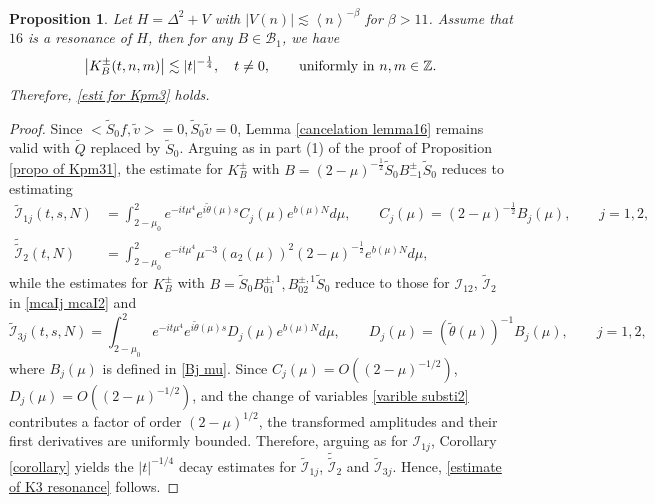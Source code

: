 \documentclass[reqno, 11pt]{amsart}
\newtheorem{proposition}[definition]{Proposition}
\newcommand\Z{\mathbb{Z}}
\newcommand\mcaI{\mathcal{I}}
\newcommand\mcaB{\mathcal{B}}
\numberwithin{equation}{section}
\begin{document}
\begin{proposition}\label{propo of resonance 2}
Let $H=\Delta^2+V$ with $|V(n)|\lesssim \left<n\right>^{-\beta}$ for $\beta>11$. Assume that $16$ is a resonance of $H$, then for any $B\in\mcaB_{1}$, we have
\begin{equation}\label{estimate of K3 resonance}
\left|K^{\pm}_{B}(t,n,m)\right|\lesssim |t|^{-\frac{1}{4}},\quad t\neq0,\qquad {\rm uniformly\ in}\ n,m\in\Z.
\end{equation}
Therefore, \eqref{esti for Kpm3} holds.
\end{proposition}
\begin{proof}
Since $\big<\widetilde{S}_0f,\tilde{v}\big>=0,\widetilde{S}_0\tilde{v}=0$, Lemma \ref{cancelation lemma16} remains valid with $\widetilde Q$ replaced by $\widetilde S_0$. Arguing as in part {\rm(1)} of the proof of Proposition \ref{propo of Kpm31}, the estimate for $K^{\pm}_B$ with $B=(2-\mu)^{-\frac{1}{2}}\widetilde{S}_0B^{\pm}_{-1}\widetilde{S}_0$ reduces to estimating 
\begin{align*}
\widetilde{\mcaI}_{1j}(t,s,N)&=\int_{2-\mu_0}^{2}e^{-it\mu^4}e^{i\widetilde{\theta}(\mu)s}C_j(\mu)e^{b(\mu)N}d\mu,\qquad C_j(\mu)=(2-\mu)^{-\frac12}B_{j}(\mu),\qquad j=1,2,\\
\widetilde{\widetilde{\mcaI}}_{2}(t,N)&=\int_{2-\mu_0}^{2}e^{-it\mu^4}\mu^{-3}(a_2(\mu))^2(2-\mu)^{-\frac{1}{2}}e^{b(\mu)N}d\mu,
\end{align*}
while the estimates for $K^{\pm}_B$ with $B=\widetilde{S}_0B^{\pm,1}_{01},B^{\pm,1}_{02}\widetilde{S}_0$ reduce to those for $\mcaI_{12}$, $\widetilde{\mcaI}_2$ in \eqref{mcaIj mcaI2} and  
\begin{equation*}
    \widetilde{\mcaI}_{3j}(t,s,N)=\int_{2-\mu_0}^{2}e^{-it\mu^4}e^{i\widetilde{\theta}(\mu)s}D_j(\mu)e^{b(\mu)N}d\mu,\qquad D_j(\mu)=(\tilde{\theta}(\mu))^{-1}B_j(\mu),\qquad j=1,2,
\end{equation*}
where $B_j(\mu)$ is defined in \eqref{Bj mu}. Since $C_j(\mu)=O((2-\mu)^{-1/2})$, $D_j(\mu)=O((2-\mu)^{-1/2})$, and the change of variables \eqref{varible substi2} contributes a factor of order $(2-\mu)^{1/2}$, the transformed amplitudes and their first derivatives are uniformly bounded. Therefore, arguing as for $\mcaI_{1j}$, Corollary \ref{corollary} yields the $|t|^{-1/4}$ decay estimates for $\widetilde{\mcaI}_{1j}$, $\widetilde{\widetilde{\mcaI}}_2$ and $\widetilde{\mcaI}_{3j}$. Hence, \eqref{estimate of K3 resonance} follows.
\end{proof}
\end{document}
